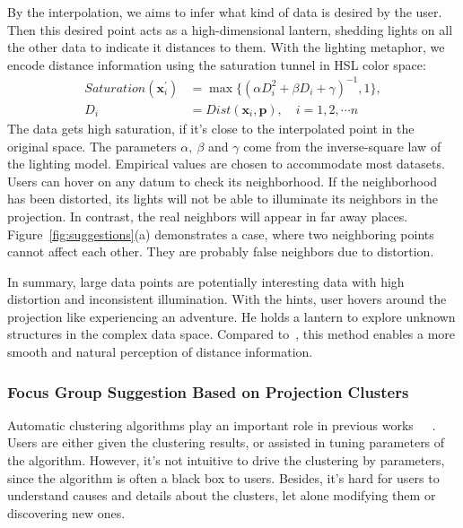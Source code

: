 By the interpolation, we aims to infer what kind of data is desired by the user. Then this desired point acts as a high-dimensional lantern, shedding lights on all the other data to indicate it distances to them. With the lighting metaphor, we encode distance information using the saturation tunnel in HSL color space:
\begin{equation}
\begin{split}
Saturation(\mathbf{x}_{i}^{\prime}) &= \max{\{(\alpha D_{i}^{2} + \beta D_{i} + \gamma)^{-1}, 1\}},\\
D_{i} &= Dist(\mathbf{x}_{i}, \mathbf{p}), \quad i = 1,2,\cdots n
\end{split}
\end{equation}
The data gets high saturation, if it's close to the interpolated point in the original space. The parameters $\alpha,\ \beta$ and $\gamma$ come from the inverse-square law of the lighting model. Empirical values are chosen to accommodate most datasets. Users can hover on any datum to check its neighborhood. If the neighborhood has been distorted, its lights will not be able to illuminate its neighbors in the projection. In contrast, the real neighbors will appear in far away places. Figure~\ref{fig:suggestions}(a) demonstrates a case, where two neighboring points cannot affect each other. They are probably false neighbors due to distortion.

In summary, large data points are potentially interesting data with high distortion and inconsistent illumination. With the hints, user hovers around the projection like experiencing an adventure. He holds a lantern to explore unknown structures in the complex data space. Compared to~\cite{DBLP:journals/tvcg/StahnkeDMT16}, this method enables a more smooth and natural perception of distance information.

\subsubsection{Focus Group Suggestion Based on Projection Clusters}
Automatic clustering algorithms play an important role in previous works~\cite{DBLP:conf/ieeevast/NamHMZI07}~\cite{DBLP:journals/cgf/LeeKCSP12}~\cite{DBLP:journals/cgf/LiuWTBP15}. Users are either given the clustering results, or assisted in tuning parameters of the algorithm. However, it's not intuitive to drive the clustering by parameters, since the algorithm is often a black box to users. Besides, it's hard for users to understand causes and details about the clusters, let alone modifying them or discovering new ones.

